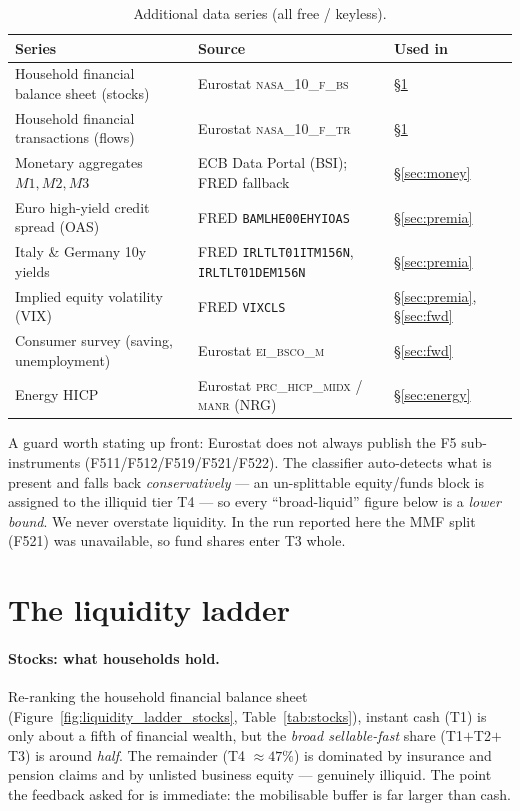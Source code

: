\documentclass[11pt,a4paper]{article}
\newcommand{\code}[1]{\texttt{#1}}
\newcommand{\dataset}[1]{\textsc{#1}}
\begin{document}
\begin{table}[htbp]\centering\small
\caption{Additional data series (all free / keyless).}
\label{tab:data}
\begin{tabular}{@{}p{4.6cm}p{5.0cm}p{5.2cm}@{}}
\toprule
\textbf{Series} & \textbf{Source} & \textbf{Used in} \\
\midrule
Household financial balance sheet (stocks) & Eurostat \dataset{nasa\_10\_f\_bs} &
  \S\ref{sec:ladder} \\
Household financial transactions (flows) & Eurostat \dataset{nasa\_10\_f\_tr} &
  \S\ref{sec:ladder} \\
Monetary aggregates $M1,M2,M3$ & ECB Data Portal (\dataset{BSI}); FRED fallback &
  \S\ref{sec:money} \\
Euro high-yield credit spread (OAS) & FRED \code{BAMLHE00EHYIOAS} &
  \S\ref{sec:premia} \\
Italy \& Germany 10y yields & FRED \code{IRLTLT01ITM156N}, \code{IRLTLT01DEM156N} &
  \S\ref{sec:premia} \\
Implied equity volatility (VIX) & FRED \code{VIXCLS} &
  \S\ref{sec:premia}, \S\ref{sec:fwd} \\
Consumer survey (saving, unemployment) & Eurostat \dataset{ei\_bsco\_m} &
  \S\ref{sec:fwd} \\
Energy HICP & Eurostat \dataset{prc\_hicp\_midx} / \dataset{manr} (NRG) &
  \S\ref{sec:energy} \\
\bottomrule
\end{tabular}
\end{table}

A guard worth stating up front: Eurostat does not always publish the F5
sub-instruments (F511/F512/F519/F521/F522). The classifier auto-detects what is
present and falls back \emph{conservatively} --- an un-splittable equity/funds
block is assigned to the illiquid tier T4 --- so every ``broad-liquid'' figure
below is a \emph{lower bound}. We never overstate liquidity. In the run reported
here the MMF split (F521) was unavailable, so fund shares enter T3 whole.

\section{The liquidity ladder}\label{sec:ladder}

\paragraph{Stocks: what households hold.} Re-ranking the household financial
balance sheet (Figure~\ref{fig:liquidity_ladder_stocks},
Table~\ref{tab:stocks}), instant cash (T1) is only about a fifth of financial
wealth, but the \emph{broad sellable-fast} share (T1$+$T2$+$T3) is around
\emph{half}. The remainder (T4 $\approx 47\%$) is dominated by insurance and
pension claims and by unlisted business equity --- genuinely illiquid. The point
the feedback asked for is immediate: the mobilisable buffer is far larger than
cash.
\end{document}
